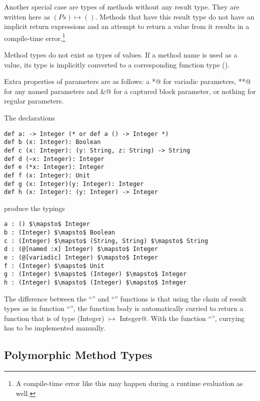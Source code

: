 Another special case are types of methods without any result type. They are written here as $(Ps) \mapsto ()$. Methods that have this result type do not have an implicit return expressions and an attempt to return a value from it results in a compile-time error.\footnote{A compile-time error like this may happen during a runtime evaluation as well.}

Method types do not exist as types of values. If a method name is used as a value, its type is implicitly converted to a corresponding function type (). 

Extra properties of parameters are as follows: a \lstinline@*@ for variadic parameters, \lstinline@**@ for any named parameters and \lstinline@&@ for a captured block parameter, or nothing for regular parameters. 

\example The declarations
\begin{lstlisting}
def a: -> Integer (* or def a () -> Integer *)
def b (x: Integer): Boolean
def c (x: Integer): (y: String, z: String) -> String
def d (~x: Integer): Integer
def e (*x: Integer): Integer
def f (x: Integer): Unit
def g (x: Integer)(y: Integer): Integer
def h (x: Integer): (y: Integer) -> Integer
\end{lstlisting}
produce the typings
\begin{lstlisting}
a : () $\mapsto$ Integer
b : (Integer) $\mapsto$ Boolean
c : (Integer) $\mapsto$ (String, String) $\mapsto$ String
d : (@[named :x] Integer) $\mapsto$ Integer
e : (@[variadic] Integer) $\mapsto$ Integer
f : (Integer) $\mapsto$ Unit
g : (Integer) $\mapsto$ (Integer) $\mapsto$ Integer
h : (Integer) $\mapsto$ (Integer) $\mapsto$ Integer
\end{lstlisting}

The difference between the ``'' and ``'' functions is that using the chain of result types as in function ``'', the function body is automatically curried to return a function that is of type \lstinline@(Integer) $\mapsto$ Integer@. With the function ``'', currying has to be implemented manually. 






\subsection{Polymorphic Method Types}
\label{sec:polymorphic-method-types}

